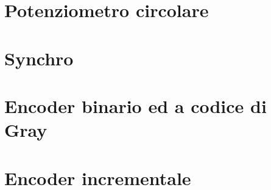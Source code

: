 \section{Potenziometro circolare}
\section{Synchro}
\section{Encoder binario ed a codice di Gray}
\section{Encoder incrementale}
